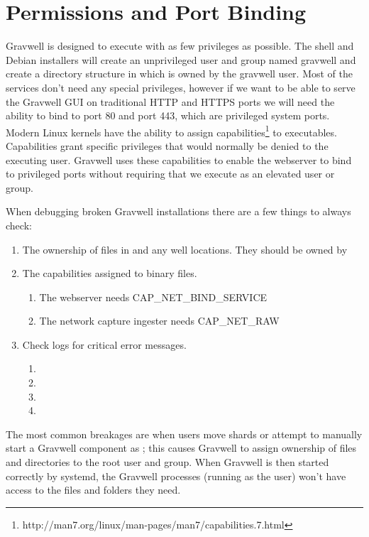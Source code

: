 \section{Permissions and Port Binding}
Gravwell is designed to execute with as few privileges as possible.
The shell and Debian installers will create an unprivileged user and
group named gravwell and create a directory structure in
 which is owned by the gravwell user.
Most of the services don't need any special privileges, however
if we want to be able to serve the Gravwell GUI on traditional HTTP and
HTTPS ports we will need the ability to bind to port 80 and port 443,
which are privileged system ports. Modern Linux kernels have the
ability to assign
capabilities\footnote{http://man7.org/linux/man-pages/man7/capabilities.7.html} to
executables. Capabilities grant specific privileges that would normally be 
denied to the executing user. Gravwell uses these capabilities to enable the
webserver to bind to privileged ports without requiring that we execute
as an elevated user or group.

When debugging broken Gravwell installations there are a few things to
always check:

\begin{enumerate}
\item
  The ownership of files in  and any well locations. They should be owned by 
\item
  The capabilities assigned to binary files.
	\begin{enumerate}
	\item
	  The webserver needs CAP\_NET\_BIND\_SERVICE
	\item
	  The network capture ingester needs CAP\_NET\_RAW
	\end{enumerate}
\item
  Check logs for critical error messages.
	\begin{enumerate}
	\item {}
	\item {}
	\item {}
	\item {}
	\end{enumerate}
\end{enumerate}

The most common breakages are when users move shards or attempt to
manually start a Gravwell component as ; this causes Gravwell to
assign ownership of files and directories to the root user and
group. When Gravwell is then started correctly by systemd, the Gravwell
processes (running as the  user) won't have access to the
files and folders they need.

